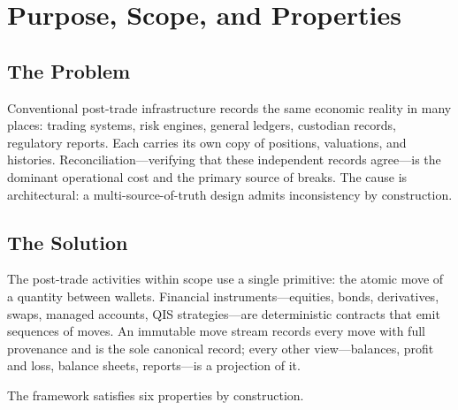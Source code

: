 \section{Purpose, Scope, and Properties}
\label{sec:sec01}
\label{sec:intro}

\subsection{The Problem}

Conventional post-trade infrastructure records the same economic reality in many places: trading systems, risk engines, general ledgers, custodian records, regulatory reports. Each carries its own copy of positions, valuations, and histories. Reconciliation---verifying that these independent records agree---is the dominant operational cost and the primary source of breaks. The cause is architectural: a multi-source-of-truth design admits inconsistency by construction.

\subsection{The Solution}

The post-trade activities within scope use a single primitive: the atomic move of a quantity between wallets. Financial instruments---equities, bonds, derivatives, swaps, managed accounts, QIS strategies---are deterministic contracts that emit sequences of moves. An immutable move stream records every move with full provenance and is the sole canonical record; every other view---balances, profit and loss, balance sheets, reports---is a projection of it.

The framework satisfies six properties by construction.

